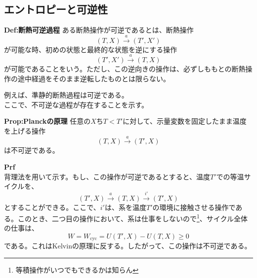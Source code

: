 \documentclass[a4paper,11pt]{jsarticle}
\begin{document}
\subsection{エントロピーと可逆性}
\begin{itembox}[l]{\textbf{Def:断熱可逆過程}}
    ある断熱操作が可逆であるとは、断熱操作
    \begin{equation}
        (T,X) \xrightarrow{a} (T',X')
    \end{equation}
    が可能な時、初めの状態と最終的な状態を逆にする操作
    \begin{equation}
        (T',X') \xrightarrow{a} (T,X)
    \end{equation}
    が可能であることをいう。ただし、この逆向きの操作は、必ずしももとの断熱操作の途中経過をそのまま逆転したものとは限らない。
\end{itembox}
例えば、準静的断熱過程は可逆である。\\
ここで、不可逆な過程が存在することを示す。\\
\begin{itembox}[l]{\textbf{Prop:Planckの原理}}
    任意の$X$ち$T<T'$に対して、示量変数を固定したまま温度を上げる操作
    \begin{equation}
        (T,X) \xrightarrow{a} (T',X)
    \end{equation}
    は不可逆である。
\end{itembox}
\textbf{Prf}\\
背理法を用いて示す。もし、この操作が可逆であるとすると、温度$T'$での等温サイクルを、
\begin{equation}
    (T',X) \xrightarrow{a} (T,X) \xrightarrow{i'} (T',X)
\end{equation}
とすることができる。ここで、$i'$は、系を温度$T'$の環境に接触させる操作である。このとき、二つ目の操作において、系は仕事をしないので\footnote{等積操作がいつでもできるかは知らん}、サイクル全体の仕事は、
\begin{equation}
    W = W_{\text{cyc}} = U(T',X) - U(T,X) \geq 0
\end{equation}
である。これはKelvinの原理に反する。したがって、この操作は不可逆である。\\
\end{document}
